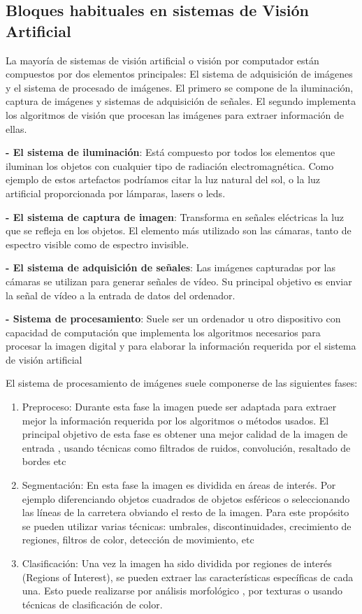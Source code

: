 \subsection{Bloques habituales en sistemas de Visión Artificial}
La mayoría de sistemas de visión artificial o visión por computador están compuestos por dos elementos principales:  El sistema de adquisición de imágenes y el sistema de procesado de imágenes. El primero se compone de la iluminación, captura de imágenes y sistemas de adquisición de señales. El segundo implementa los algoritmos de visión que procesan las imágenes para extraer información de ellas.

	\textbf{- El sistema de iluminación}: Está compuesto por todos los elementos que iluminan los objetos con cualquier tipo de radiación electromagnética. Como ejemplo de estos artefactos podríamos citar la luz natural del sol, o la luz artificial proporcionada por lámparas, lasers o leds.

	\textbf{- El sistema de captura de imagen}: Transforma en señales eléctricas la luz que se refleja en los objetos. El elemento más utilizado son las cámaras, tanto de espectro visible como de espectro invisible.

	\textbf{- El sistema de adquisición de señales}: Las imágenes capturadas por las cámaras se utilizan para generar señales de vídeo. Su principal objetivo es enviar la señal de vídeo a la entrada de datos del ordenador.

	\textbf{- Sistema de procesamiento}: Suele ser un ordenador u otro dispositivo con capacidad de computación que implementa los algoritmos necesarios para procesar la imagen digital y para elaborar la información requerida por el sistema de visión artificial

	El sistema de procesamiento de imágenes suele componerse de las siguientes fases:
    \begin{enumerate}
		\item{Preproceso}: Durante esta fase la imagen puede ser adaptada para extraer mejor la información requerida por los algoritmos o métodos usados. El principal objetivo de esta fase es obtener una mejor calidad de la imagen de entrada , usando técnicas como filtrados de ruidos, convolución, resaltado de bordes etc

		\item{Segmentación}: En esta fase la imagen es dividida en áreas de interés. Por ejemplo diferenciando objetos cuadrados de objetos esféricos o seleccionando las líneas de la carretera obviando el resto de la imagen. Para este propósito se pueden utilizar varias técnicas: umbrales, discontinuidades, crecimiento de regiones, filtros de color, detección de movimiento, etc

		\item{Clasificación}: Una vez la imagen ha sido dividida por regiones de interés (Regions of Interest), se pueden extraer las características específicas de cada una. Esto puede realizarse por análisis morfológico , por texturas o usando técnicas de clasificación de color.
	\end{enumerate}

